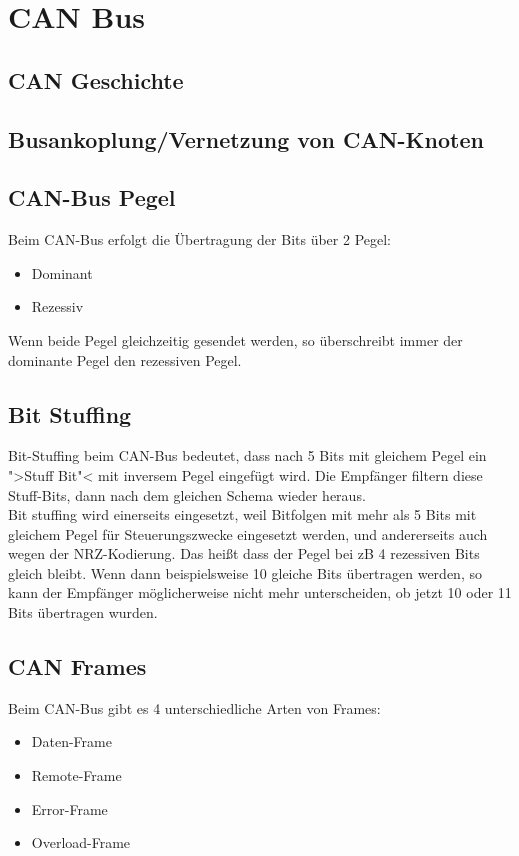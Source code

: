 \section{CAN Bus}

	\subsection{CAN Geschichte}
	
	\subsection{Busankoplung/Vernetzung von CAN-Knoten}
	
	\subsection{CAN-Bus Pegel}
	Beim CAN-Bus erfolgt die Übertragung der Bits über 2 Pegel:
	\begin{itemize}
	\item Dominant
	\item Rezessiv
	\end{itemize}

	Wenn beide Pegel gleichzeitig gesendet werden, so überschreibt immer der dominante Pegel den rezessiven Pegel.
	
	\subsection{Bit Stuffing}
	Bit-Stuffing beim CAN-Bus bedeutet, dass nach 5 Bits mit gleichem Pegel ein ">Stuff Bit"< mit inversem Pegel eingefügt wird. Die Empfänger filtern diese Stuff-Bits, dann nach dem gleichen Schema wieder heraus.\\ Bit stuffing wird einerseits eingesetzt, weil Bitfolgen mit mehr als 5 Bits mit gleichem Pegel für Steuerungszwecke eingesetzt werden, und andererseits auch wegen der NRZ-Kodierung. Das heißt dass der Pegel bei zB 4 rezessiven Bits gleich bleibt. Wenn dann beispielsweise 10 gleiche Bits übertragen werden, so kann der Empfänger möglicherweise nicht mehr unterscheiden, ob jetzt 10 oder 11 Bits übertragen wurden.
	
	\subsection{CAN Frames}
	Beim CAN-Bus gibt es 4 unterschiedliche Arten von Frames:
	\begin{itemize}
	\item Daten-Frame
	\item Remote-Frame
	\item Error-Frame
	\item Overload-Frame
	\end{itemize}
